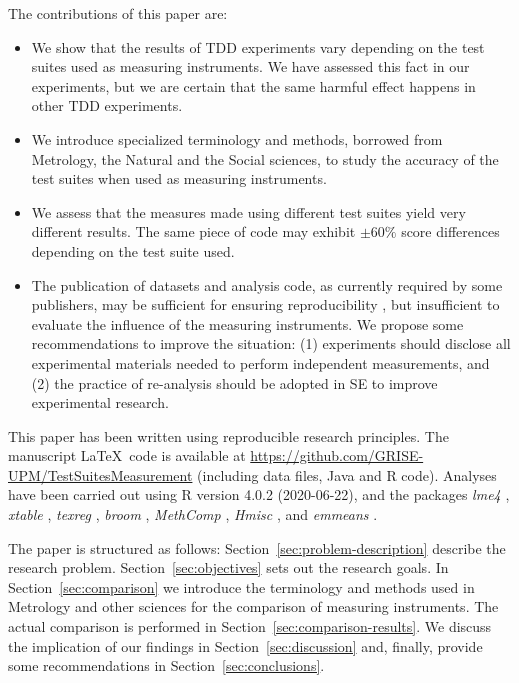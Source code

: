 The contributions of this paper are:
\begin{itemize}

\item We show that the results of TDD experiments vary depending on the test suites used as measuring instruments. We have assessed this fact in our experiments, but we are certain that the same harmful effect happens in other TDD experiments.

\item We introduce specialized terminology and methods, borrowed from Metrology, the Natural and the Social sciences, to study the accuracy of the test suites when used as measuring instruments.

\item We assess that the measures made using different test suites yield very different results. The same piece of code may exhibit $\pm 60\%$ score differences depending on the test suite used.

\item The publication of datasets and analysis code, as currently required by some publishers, may be sufficient for ensuring reproducibility \cite{NAP25303,fernandez2019open}, but insufficient to evaluate the influence of the measuring instruments. We propose some recommendations to improve the situation: (1) experiments should disclose all experimental materials needed to perform independent measurements, and (2) the practice of re-analysis \cite{mittelstaedt1984econometric,IJzendoorn1994} should be adopted in SE to improve experimental research. 

\end{itemize}

This paper has been written using reproducible research principles. The manuscript \LaTeX~code  is available at \url{https://github.com/GRISE-UPM/TestSuitesMeasurement} (including data files, Java and R code). Analyses have been carried out using R \cite{R} version 4.0.2 (2020-06-22), and the packages \textit{lme4} \cite{lme4}, \textit{xtable} \cite{xtable}, \textit{texreg} \cite{texreg}, \textit{broom} \cite{broom}, \textit{MethComp} \cite{MethComp}, \textit{Hmisc} \cite{Hmisc}, and \textit{emmeans} \cite{emmeans}.

The paper is structured as follows: Section~\ref{sec:problem-description} describe the research problem. Section~\ref{sec:objectives} sets out the research goals. In Section~\ref{sec:comparison} we introduce the terminology and methods used in Metrology and other sciences for the comparison of measuring instruments. The actual comparison is performed in Section~\ref{sec:comparison-results}. We discuss the implication of our findings in Section~\ref{sec:discussion} and, finally, provide some recommendations in Section~\ref{sec:conclusions}.